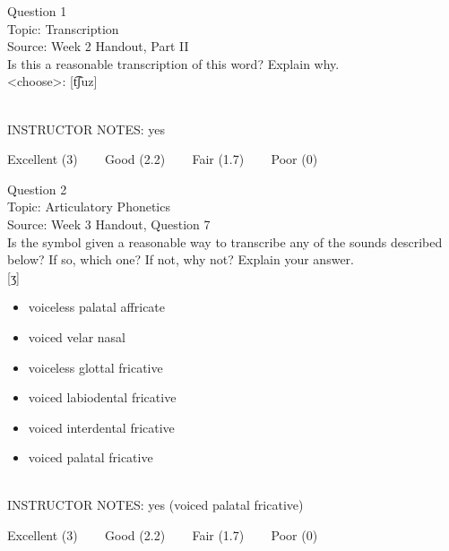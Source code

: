 \documentclass[12pt]{article}
\begin{document}
\begin{center}
\textbf{{\color{blue}{\HUGE START OF EXAM\\}}}

\textbf{{\color{blue}{\HUGE Student ID: 51967\\}}}

\textbf{{\color{blue}{\HUGE \\}}}

\end{center}
\newpage

{\large Question 1}\\

Topic: Transcription\\
Source: Week 2 Handout, Part II\\

Is this a reasonable transcription of this word? Explain why.\\

<choose>: {[t͡ʃuz]}


~\\
INSTRUCTOR NOTES: yes


\vfill
Excellent (3) ~~~ Good (2.2) ~~~ Fair (1.7) ~~~ Poor (0)
\newpage

{\large Question 2}\\

Topic: Articulatory Phonetics\\
Source: Week 3 Handout, Question 7\\

Is the symbol given a reasonable way to transcribe any of the sounds described below? If so, which one? If not, why not? Explain your answer.\\

{[ʒ]}

\begin{itemize} \item voiceless palatal affricate \item voiced velar nasal \item voiceless glottal fricative \item voiced labiodental fricative \item voiced interdental fricative \item voiced palatal fricative \end{itemize}


~\\
INSTRUCTOR NOTES: yes (voiced palatal fricative)


\vfill
Excellent (3) ~~~ Good (2.2) ~~~ Fair (1.7) ~~~ Poor (0)
\newpage
\end{document}
